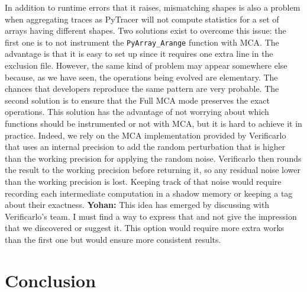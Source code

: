 \documentclass[11pt]{article}
\newcommand{\tristan}[1]{\color{orange}\textbf{From Tristan:} #1\color{black}\xspace}
\newcommand{\Yohan}[1]{\color{green!75!black}\textbf{Yohan:} #1\color{black}\xspace}
\newcommand{\pytracer}[0]{PyTracer\xspace}
\begin{document}
In addition to runtime errors that it raises, mismatching shapes is also a problem when aggregating traces as \pytracer will not compute statistics for a set of arrays having different shapes.
Two solutions exist to overcome this issue: the first one is to not instrument the \texttt{PyArray\_Arange} function with MCA. The advantage is that it is easy to set up since it requires one extra line in the exclusion file.
However, the same kind of problem may appear somewhere else
because, as we have seen, the operations being evolved are elementary. The chances that developers reproduce the same pattern are very probable. The second solution is to ensure that the Full MCA mode preserves the exact operations.
This solution has the advantage of not worrying about which functions should be instrumented or not with MCA, but it is hard to achieve it in practice. Indeed, we rely on the MCA implementation provided by Verificarlo that uses an internal precision to add the random perturbation that is higher than the working precision for applying the random noise. Verificarlo then rounds the result to the working precision before returning it, so any residual noise lower than the working precision is lost. 
Keeping track of that noise would require recording each intermediate computation in a shadow memory or keeping a tag about their exactness.
\Yohan{This idea has emerged by discussing with Verificarlo's team. 
I must find a way to express that and not give the impression that we discovered or suggest it.}
This option would require more extra works than the first one but would ensure more consistent results.

\section{Conclusion}


\end{document}
